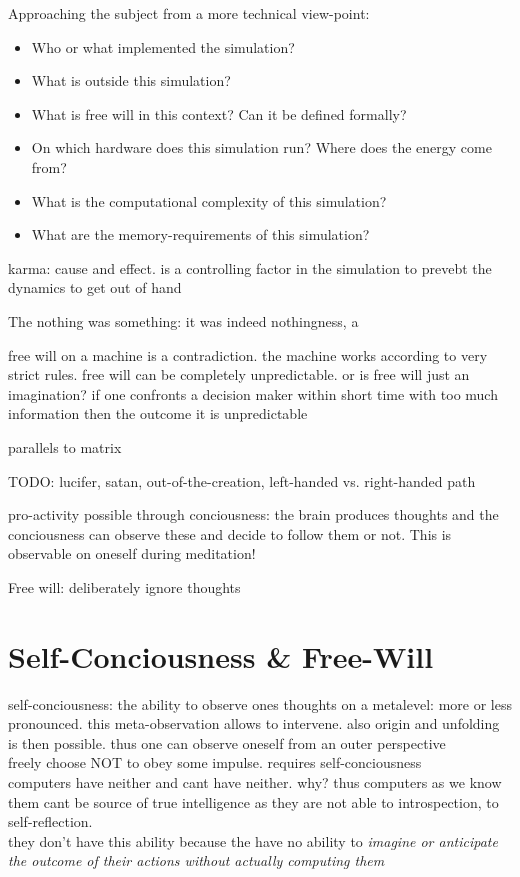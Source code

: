 \documentclass{article}
\begin{document}
Approaching the subject from a more technical view-point:

\begin{itemize}
\item Who or what implemented the simulation?
\item What is outside this simulation?
\item What is free will in this context? Can it be defined formally?
\item On which hardware does this simulation run? Where does the energy come from?
\item What is the computational complexity of this simulation?
\item What are the memory-requirements of this simulation?
\end{itemize}

karma: cause and effect. is a controlling factor in the simulation to prevebt the dynamics to get out of hand

The nothing was something: it was indeed nothingness, a

free will on a machine is a contradiction. the machine works according to very strict rules. free will can be completely unpredictable. or is free will just an imagination? if one confronts a decision maker within short time with too much information then the outcome it is unpredictable 

parallels to matrix

TODO: lucifer, satan, out-of-the-creation, left-handed vs. right-handed path

pro-activity possible through conciousness: the brain produces thoughts and the conciousness can observe these and decide to follow them or not. This is observable on oneself during meditation!

Free will: deliberately ignore thoughts

\section{Self-Conciousness \& Free-Will}
self-conciousness: the ability to observe ones thoughts on a metalevel: more or less pronounced. this meta-observation allows to intervene. also origin and unfolding is then possible. thus one can observe oneself from an outer perspective \\

freely choose NOT to obey some impulse. requires self-conciousness \\

computers have neither and cant have neither. why? thus computers as we know them cant be source of true intelligence as they are not able to introspection, to self-reflection. \\
they don't have this ability because the have no ability to \textit{imagine or anticipate the outcome of their actions without actually computing them}
\end{document}
